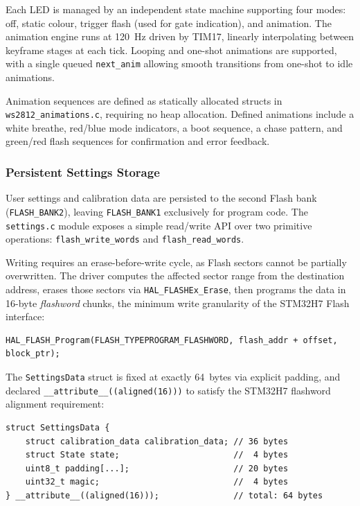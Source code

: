 Each LED is managed by an independent state machine supporting four modes: off, static colour, trigger flash (used for gate indication), and animation.
The animation engine runs at \qty{120}{Hz} driven by TIM17, linearly interpolating between keyframe stages at each tick.
Looping and one-shot animations are supported, with a single queued \texttt{next\_anim} allowing smooth transitions from one-shot to idle animations.

Animation sequences are defined as statically allocated structs in \texttt{ws2812\_animations.c}, requiring no heap allocation.
Defined animations include a white breathe, red/blue mode indicators, a boot sequence, a chase pattern, and green/red flash sequences for confirmation and error feedback.

\subsubsection{Persistent Settings Storage}

User settings and calibration data are persisted to the second Flash bank 
(\texttt{FLASH\_BANK2}), leaving \texttt{FLASH\_BANK1} exclusively for program code. 
The \texttt{settings.c} module exposes a simple read/write API over two primitive 
operations: \texttt{flash\_write\_words} and \texttt{flash\_read\_words}.

Writing requires an erase-before-write cycle, as Flash sectors cannot be partially 
overwritten. The driver computes the affected sector range from the destination address, 
erases those sectors via \texttt{HAL\_FLASHEx\_Erase}, then programs the data in 
16-byte \textit{flashword} chunks, the minimum write granularity of the STM32H7
Flash interface:

\begin{verbatim}
HAL_FLASH_Program(FLASH_TYPEPROGRAM_FLASHWORD, flash_addr + offset, block_ptr);
\end{verbatim}

The \texttt{SettingsData} struct is fixed at exactly \qty{64}{bytes} via explicit 
padding, and declared \newline \texttt{\_\_attribute\_\_((aligned(16)))} to satisfy the 
STM32H7 flashword alignment requirement:

\begin{verbatim}
struct SettingsData {
	struct calibration_data calibration_data; // 36 bytes
	struct State state;                       //  4 bytes
	uint8_t padding[...];                     // 20 bytes
	uint32_t magic;                           //  4 bytes
} __attribute__((aligned(16)));               // total: 64 bytes
\end{verbatim}

